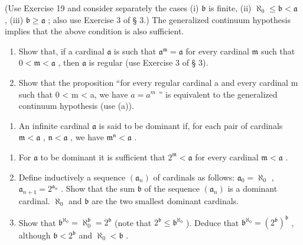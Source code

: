 (Use Exercise 19 and consider separately the cases (i) \(\mathfrak{b}\) is finite, (ii) \(\aleph_0 \leqslant \mathfrak{b} < \mathfrak{a}\) , (iii) \(\mathfrak{b} \geqslant \mathfrak{a}\) ; also use Exercise 3 of § 3.) The generalized continuum hypothesis implies that the above condition is also sufficient.

\begin{enumerate}
\def\labelenumi{(\alph{enumi})}
\setcounter{enumi}{1}
\item
  Show that, if a cardinal \(\mathfrak{a}\) is such that \(\mathfrak{a}^{\mathfrak{m}} = \mathfrak{a}\) for every cardinal \(\mathfrak{m}\) such that \(0 < \mathfrak{m} < \mathfrak{a}\) , then \(\mathfrak{a}\) is regular (use Exercise 3 of § 3).
\item
  Show that the proposition ``for every regular cardinal a and every cardinal m such that 0 \textless{} m \textless{} a, we have \(a = a^{m}\) '' is equivalent to the generalized continuum hypothesis (use (a)).
\end{enumerate}

\begin{enumerate}
\def\labelenumi{\arabic{enumi}.}
\setcounter{enumi}{20}
\tightlist
\item
  An infinite cardinal \(\mathfrak{a}\) is said to be dominant if, for each pair of cardinals \(\mathfrak{m} < \mathfrak{a}\) , \(\mathfrak{n} < \mathfrak{a}\) , we have \(\mathfrak{m}^{\mathfrak{n}} < \mathfrak{a}\) .
\end{enumerate}

\begin{enumerate}
\def\labelenumi{(\alph{enumi})}
\item
  For \(\mathfrak{a}\) to be dominant it is sufficient that \(2^{\mathfrak{m}} < \mathfrak{a}\) for every cardinal \(\mathfrak{m} < \mathfrak{a}\) .
\item
  Define inductively a sequence \((\mathfrak{a}_n)\) of cardinals as follows: \(\mathfrak{a}_0 = \aleph_0\) , \(\mathfrak{a}_{n+1} = 2^{\mathfrak{a}_n}\) . Show that the sum \(\mathfrak{b}\) of the sequence \((\mathfrak{a}_n)\) is a dominant cardinal. \(\aleph_0\) and \(\mathfrak{b}\) are the two smallest dominant cardinals.
\item
  Show that \(\mathfrak{b}^{\aleph_0} = \aleph_0^{\mathfrak{b}} = 2^{\mathfrak{b}}\) (note that \(2^{\mathfrak{b}} \leqslant \mathfrak{b}^{\aleph_0}\) ). Deduce that \(\mathfrak{b}^{\aleph_0} = (2^{\mathfrak{b}})^{\mathfrak{b}}\) , although \(\mathfrak{b} < 2^{\mathfrak{b}}\) and \(\aleph_0 < \mathfrak{b}\) .
\end{enumerate}


